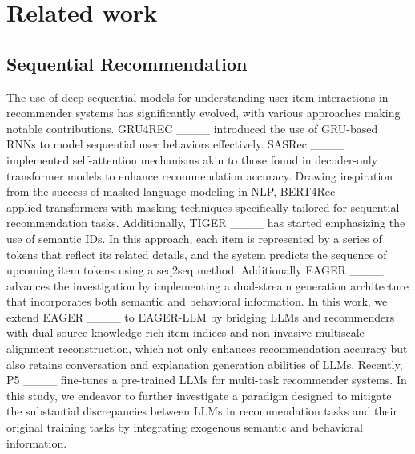 \section{Related work}
\subsection{Sequential Recommendation}
The use of deep sequential models for understanding user-item interactions in recommender systems has significantly evolved, with various approaches making notable contributions. GRU4REC ____ introduced the use of GRU-based RNNs to model sequential user behaviors effectively. SASRec ____ implemented self-attention mechanisms akin to those found in decoder-only transformer models to enhance recommendation accuracy. Drawing inspiration from the success of masked language modeling in NLP, BERT4Rec ____ applied transformers with masking techniques specifically tailored for sequential recommendation tasks. Additionally, TIGER ____ has started emphasizing the use of semantic IDs. In this approach, each item is represented by a series of tokens that reflect its related details, and the system predicts the sequence of upcoming item tokens using a seq2seq method. Additionally EAGER ____ advances the investigation by implementing a dual-stream generation architecture that incorporates both semantic and behavioral information. In this work, we extend EAGER ____ to EAGER-LLM by bridging LLMs and recommenders with dual-source knowledge-rich item indices and non-invasive multiscale alignment reconstruction, which not only enhances recommendation accuracy but also retains conversation and explanation generation abilities of LLMs. Recently, P5 ____ fine-tunes a pre-trained LLMs for multi-task recommender systems. In this study, we endeavor to further investigate a paradigm designed to mitigate the substantial discrepancies between LLMs in recommendation tasks and their original training tasks by integrating exogenous semantic and behavioral information.

